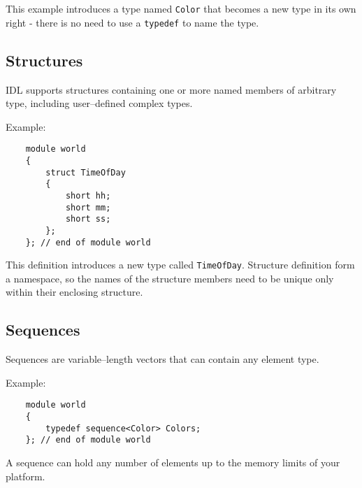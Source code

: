 This example introduces a type named {\tt Color} that becomes a new type in its
own right - there is no need to use a {\tt typedef} to name the type.


\subsection{Structures}
IDL supports structures containing one or more named members of arbitrary type,
including user--defined complex types.

\vspace{4mm}
Example:
\begin{verbatim}
    module world
    {
        struct TimeOfDay
        {
            short hh;
            short mm;
            short ss;
        };
    }; // end of module world
\end{verbatim}

This definition introduces a new type called {\tt TimeOfDay}.
Structure definition form a namespace, so the names of the structure members
need to be unique only within their enclosing structure.

\subsection{Sequences}
Sequences are variable--length vectors that can contain any element type. 

\vspace{2mm}
Example:
\begin{verbatim}
    module world
    {
        typedef sequence<Color> Colors; 
    }; // end of module world
\end{verbatim}

A sequence can hold any number of elements up to the memory limits of your
platform. 

\vspace{5mm}

